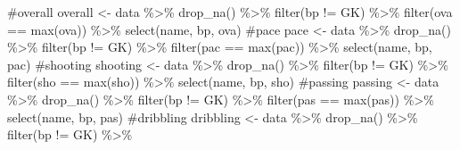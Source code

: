 \documentclass[
  letterpaper,
  DIV=11,
  numbers=noendperiod]{scrartcl}
\newenvironment{Shaded}{\begin{snugshade}}{\end{snugshade}}
\newcommand{\CommentTok}[1]{\textcolor[rgb]{0.37,0.37,0.37}{#1}}
\newcommand{\FunctionTok}[1]{\textcolor[rgb]{0.28,0.35,0.67}{#1}}
\newcommand{\NormalTok}[1]{\textcolor[rgb]{0.00,0.23,0.31}{#1}}
\newcommand{\OtherTok}[1]{\textcolor[rgb]{0.00,0.23,0.31}{#1}}
\newcommand{\SpecialCharTok}[1]{\textcolor[rgb]{0.37,0.37,0.37}{#1}}
\newcommand{\StringTok}[1]{\textcolor[rgb]{0.13,0.47,0.30}{#1}}
\begin{document}
\begin{Shaded}
\begin{Highlighting}[]
\CommentTok{\#overall}
\NormalTok{overall }\OtherTok{\textless{}{-}}\NormalTok{ data }\SpecialCharTok{\%\textgreater{}\%} 
  \FunctionTok{drop\_na}\NormalTok{() }\SpecialCharTok{\%\textgreater{}\%} 
  \FunctionTok{filter}\NormalTok{(bp }\SpecialCharTok{!=} \StringTok{\textquotesingle{}GK\textquotesingle{}}\NormalTok{) }\SpecialCharTok{\%\textgreater{}\%} 
  \FunctionTok{filter}\NormalTok{(ova }\SpecialCharTok{==} \FunctionTok{max}\NormalTok{(ova)) }\SpecialCharTok{\%\textgreater{}\%} 
  \FunctionTok{select}\NormalTok{(name, bp, ova) }
\CommentTok{\#pace}
\NormalTok{pace }\OtherTok{\textless{}{-}}\NormalTok{ data }\SpecialCharTok{\%\textgreater{}\%} 
  \FunctionTok{drop\_na}\NormalTok{() }\SpecialCharTok{\%\textgreater{}\%} 
  \FunctionTok{filter}\NormalTok{(bp }\SpecialCharTok{!=} \StringTok{\textquotesingle{}GK\textquotesingle{}}\NormalTok{) }\SpecialCharTok{\%\textgreater{}\%} 
  \FunctionTok{filter}\NormalTok{(pac }\SpecialCharTok{==} \FunctionTok{max}\NormalTok{(pac)) }\SpecialCharTok{\%\textgreater{}\%} 
  \FunctionTok{select}\NormalTok{(name, bp, pac)}
\CommentTok{\#shooting}
\NormalTok{shooting }\OtherTok{\textless{}{-}}\NormalTok{ data }\SpecialCharTok{\%\textgreater{}\%} 
  \FunctionTok{drop\_na}\NormalTok{() }\SpecialCharTok{\%\textgreater{}\%} 
  \FunctionTok{filter}\NormalTok{(bp }\SpecialCharTok{!=} \StringTok{\textquotesingle{}GK\textquotesingle{}}\NormalTok{) }\SpecialCharTok{\%\textgreater{}\%} 
  \FunctionTok{filter}\NormalTok{(sho }\SpecialCharTok{==} \FunctionTok{max}\NormalTok{(sho)) }\SpecialCharTok{\%\textgreater{}\%} 
  \FunctionTok{select}\NormalTok{(name, bp, sho)}
\CommentTok{\#passing}
\NormalTok{passing }\OtherTok{\textless{}{-}}\NormalTok{ data }\SpecialCharTok{\%\textgreater{}\%} 
  \FunctionTok{drop\_na}\NormalTok{() }\SpecialCharTok{\%\textgreater{}\%} 
  \FunctionTok{filter}\NormalTok{(bp }\SpecialCharTok{!=} \StringTok{\textquotesingle{}GK\textquotesingle{}}\NormalTok{) }\SpecialCharTok{\%\textgreater{}\%} 
  \FunctionTok{filter}\NormalTok{(pas }\SpecialCharTok{==} \FunctionTok{max}\NormalTok{(pas)) }\SpecialCharTok{\%\textgreater{}\%} 
  \FunctionTok{select}\NormalTok{(name, bp, pas)}
\CommentTok{\#dribbling}
\NormalTok{dribbling }\OtherTok{\textless{}{-}}\NormalTok{ data }\SpecialCharTok{\%\textgreater{}\%} 
  \FunctionTok{drop\_na}\NormalTok{() }\SpecialCharTok{\%\textgreater{}\%} 
  \FunctionTok{filter}\NormalTok{(bp }\SpecialCharTok{!=} \StringTok{\textquotesingle{}GK\textquotesingle{}}\NormalTok{) }\SpecialCharTok{\%\textgreater{}\%} 

\end{Highlighting}
\end{Shaded}
\end{document}
